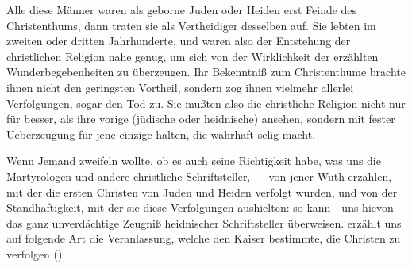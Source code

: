 \begin{aufza}
Alle diese Männer waren als geborne Juden oder Heiden erst Feinde des Christenthums, dann traten sie als Vertheidiger desselben auf. Sie lebten im zweiten oder dritten Jahrhunderte, und waren also der Entstehung der christlichen Religion nahe genug, um sich von der Wirklichkeit der erzählten Wunderbegebenheiten zu überzeugen. Ihr Bekenntniß zum Christenthume brachte ihnen nicht den geringsten Vortheil, sondern zog ihnen vielmehr allerlei Verfolgungen, sogar den Tod zu. Sie mußten also die christliche Religion nicht nur für besser, als ihre vorige (jüdische oder heidnische) ansehen, sondern mit fester Ueberzeugung für jene einzige halten, die wahrhaft selig macht.
\item Wenn Jemand zweifeln wollte, ob es auch seine Richtigkeit habe, was uns die Martyrologen und andere christliche Schriftsteller, \zB\  \umA\  von jener Wuth erzählen, mit der die ersten Christen von Juden und Heiden verfolgt wurden, und von der Standhaftigkeit, mit der sie diese Verfolgungen aushielten: so kann~\ uns hievon das ganz unverdächtige Zeugniß heidnischer Schriftsteller überweisen.  erzählt uns auf folgende Art die Veranlassung, welche den Kaiser  bestimmte, die Christen zu verfolgen (): 
\end{aufza}
